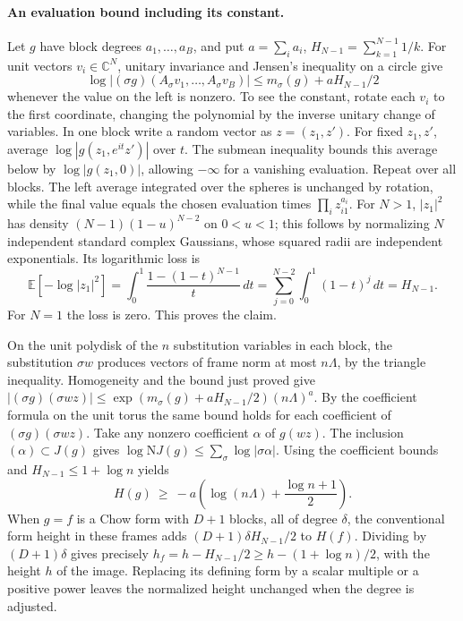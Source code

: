 \paragraph{An evaluation bound including its constant.}
Let \(g\) have block degrees \(a_1,\ldots,a_B\), and put
\(a=\sum_i a_i\), \(H_{N-1}=\sum_{k=1}^{N-1}1/k\). For unit vectors
\(v_i\in\mathbb C^N\), unitary invariance and Jensen's inequality on
a circle give
\[
 \log|(\sigma g)(A_\sigma v_1,\ldots,A_\sigma v_B)|
      \le m_\sigma(g)+a H_{N-1}/2
\]
whenever the value on the left is nonzero. To see the constant, rotate
each \(v_i\) to the first coordinate, changing the polynomial by the
inverse unitary change of variables. In one block write a random vector
as \(z=(z_1,z')\). For fixed \(z_1,z'\), average
\(\log|g(z_1,e^{it}z')|\) over \(t\). The submean inequality bounds
this average below by \(\log|g(z_1,0)|\), allowing \(-\infty\) for
a vanishing evaluation. Repeat over all blocks. The left average
integrated over the spheres is unchanged by rotation, while the final
value equals the chosen evaluation times
\(\prod_i z_{i1}^{a_i}\). For \(N>1\), \(|z_1|^2\) has density
\((N-1)(1-u)^{N-2}\) on \(0<u<1\); this follows by normalizing
\(N\) independent standard complex Gaussians, whose squared radii
are independent exponentials. Its logarithmic loss is
\[
 \mathbb E[-\log |z_1|^2]
    =\int_0^1\frac{1-(1-t)^{N-1}}t\,dt
    =\sum_{j=0}^{N-2}\int_0^1(1-t)^j\,dt=H_{N-1}.
\]
For \(N=1\) the loss is zero. This proves the claim.

On the unit polydisk of the \(n\) substitution variables in each block,
the substitution \(\sigma w\) produces vectors of frame norm at most
\(n\Lambda\), by the triangle inequality. Homogeneity and the bound just
proved give \(|(\sigma g)(\sigma w z)|\le
\exp(m_\sigma(g)+a H_{N-1}/2)(n\Lambda)^a\).
By the coefficient formula on the unit torus the same bound holds for
each coefficient of \((\sigma g)(\sigma w z)\).
Take any nonzero coefficient \(\alpha\) of \(g(wz)\).
The inclusion \((\alpha)\subset J(g)\) gives
\(\log \mathrm N J(g)\le\sum_\sigma\log|\sigma\alpha|\).
Using the coefficient bounds and \(H_{N-1}\le1+\log n\) yields
\[
 H(g)\ \ge\ -a\left(\log(n\Lambda)+\frac{\log n+1}{2}\right).
\]
When \(g=f\) is a Chow form with \(D+1\) blocks, all of degree \(\delta\),
the conventional form height in these frames adds
\((D+1)\delta H_{N-1}/2\) to \(H(f)\).
Dividing by \((D+1)\delta\) gives precisely
\(h_f=h-H_{N-1}/2\ge h-(1+\log n)/2\), with the height \(h\) of the
image. Replacing its defining form by a scalar multiple or a positive
power leaves the normalized height unchanged when the degree is adjusted.

